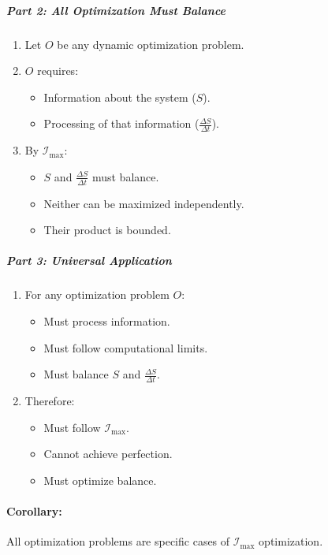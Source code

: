 \documentclass[12pt]{article}
\begin{document}
\subparagraph{Part 2: All Optimization Must Balance}
\begin{enumerate}
    \item Let \(O\) be any dynamic optimization problem.
    \item \(O\) requires:
    \begin{itemize}
        \item Information about the system (\(S\)).
        \item Processing of that information (\(\frac{\Delta S}{\Delta t}\)).
    \end{itemize}
    \item By \(\mathcal{I}_{\text{max}}\):
    \begin{itemize}
        \item \(S\) and \(\frac{\Delta S}{\Delta t}\) must balance.
        \item Neither can be maximized independently.
        \item Their product is bounded.
    \end{itemize}
\end{enumerate}

\subparagraph{Part 3: Universal Application}
\begin{enumerate}
    \item For any optimization problem \(O\):
    \begin{itemize}
        \item Must process information.
        \item Must follow computational limits.
        \item Must balance \(S\) and \(\frac{\Delta S}{\Delta t}\).
    \end{itemize}
    \item Therefore:
    \begin{itemize}
        \item Must follow \(\mathcal{I}_{\text{max}}\).
        \item Cannot achieve perfection.
        \item Must optimize balance.
    \end{itemize}
\end{enumerate}

\paragraph{Corollary:}
All optimization problems are specific cases of \(\mathcal{I}_{\text{max}}\) optimization.
\end{document}

